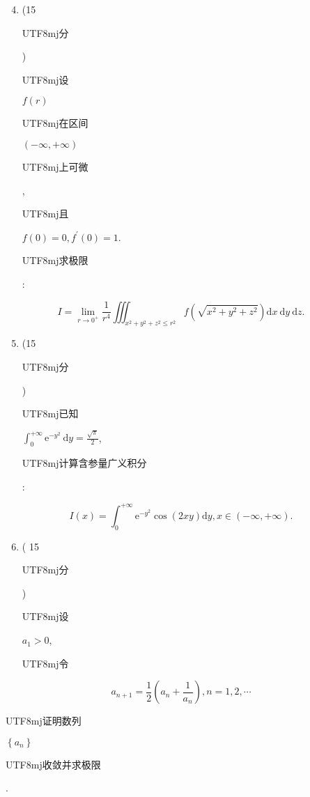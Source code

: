 \documentclass[10pt]{article}
\begin{document}
\begin{enumerate}
  \setcounter{enumi}{3}
  \item (15 \begin{CJK}{UTF8}{mj}分\end{CJK}) \begin{CJK}{UTF8}{mj}设\end{CJK} $f(r)$ \begin{CJK}{UTF8}{mj}在区间\end{CJK} $(-\infty,+\infty)$ \begin{CJK}{UTF8}{mj}上可微\end{CJK}, \begin{CJK}{UTF8}{mj}且\end{CJK} $f(0)=0, f^{\prime}(0)=1$. \begin{CJK}{UTF8}{mj}求极限\end{CJK}:
\end{enumerate}
$$
I=\lim _{r \rightarrow 0^{+}} \frac{1}{r^{4}} \iiint_{x^{2}+y^{2}+z^{2} \leq r^{2}} f\left(\sqrt{x^{2}+y^{2}+z^{2}}\right) \mathrm{d} x \mathrm{~d} y \mathrm{~d} z .
$$

\begin{enumerate}
  \setcounter{enumi}{4}
  \item (15 \begin{CJK}{UTF8}{mj}分\end{CJK}) \begin{CJK}{UTF8}{mj}已知\end{CJK} $\int_{0}^{+\infty} \mathrm{e}^{-y^{2}} \mathrm{~d} y=\frac{\sqrt{\pi}}{2}$, \begin{CJK}{UTF8}{mj}计算含参量广义积分\end{CJK}:
\end{enumerate}
$$
I(x)=\int_{0}^{+\infty} \mathrm{e}^{-y^{2}} \cos (2 x y) \mathrm{d} y, x \in(-\infty,+\infty) .
$$

\begin{enumerate}
  \setcounter{enumi}{5}
  \item ( 15 \begin{CJK}{UTF8}{mj}分\end{CJK}) \begin{CJK}{UTF8}{mj}设\end{CJK} $a_{1}>0$, \begin{CJK}{UTF8}{mj}令\end{CJK}
\end{enumerate}
$$
a_{n+1}=\frac{1}{2}\left(a_{n}+\frac{1}{a_{n}}\right), n=1,2, \cdots
$$
\begin{CJK}{UTF8}{mj}证明数列\end{CJK} $\left\{a_{n}\right\}$ \begin{CJK}{UTF8}{mj}收敛并求极限\end{CJK}.
\end{document}
